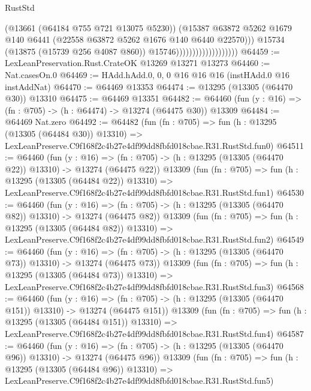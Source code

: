 \begin{lexlean}{RustStd}
\begin{coremodule}
                                            (@13661 (@64184 @755 @721 @13075 @5230))
                                            (@15387
                                              @63872
                                              @5262
                                              @1679
                                              @140
                                              @6441
                                              (@22558 @63872 @5262 @1676 @140 @6440 @22570)))
                                          @15734
                                          (@13875 (@15739 @256 @4087 @860))
                                          @15746)))))))))))))))))))
@64459 := LexLeanPreservation.Rust.CrateOK @13269 @13271 @13273
@64460 := Nat.casesOn.{0}
@64469 := HAdd.hAdd.{0, 0, 0} @16 @16 @16 (instHAdd.{0} @16 instAddNat)
@64470 := @64469 @13353
@64474 := @13295 (@13305 (@64470 @30)) @13310
@64475 := @64469 @13351
@64482 := @64460 (fun (y : @16) => (fn : @705) -> (h : @64474) -> @13274 (@64475 @30)) @13309
@64484 := @64469 Nat.zero
@64492 := @64482
    (fun (fn : @705) =>
    fun (h : @13295 (@13305 (@64484 @30)) @13310) =>
    LexLeanPreserve.C9f168f2c4b27e4df99dd8fbfd018cbae.R31.RustStd.fun0)
@64511 := @64460
    (fun (y : @16) =>
    (fn : @705) -> (h : @13295 (@13305 (@64470 @22)) @13310) -> @13274 (@64475 @22))
    @13309
    (fun (fn : @705) =>
    fun (h : @13295 (@13305 (@64484 @22)) @13310) =>
    LexLeanPreserve.C9f168f2c4b27e4df99dd8fbfd018cbae.R31.RustStd.fun1)
@64530 := @64460
    (fun (y : @16) =>
    (fn : @705) -> (h : @13295 (@13305 (@64470 @82)) @13310) -> @13274 (@64475 @82))
    @13309
    (fun (fn : @705) =>
    fun (h : @13295 (@13305 (@64484 @82)) @13310) =>
    LexLeanPreserve.C9f168f2c4b27e4df99dd8fbfd018cbae.R31.RustStd.fun2)
@64549 := @64460
    (fun (y : @16) =>
    (fn : @705) -> (h : @13295 (@13305 (@64470 @73)) @13310) -> @13274 (@64475 @73))
    @13309
    (fun (fn : @705) =>
    fun (h : @13295 (@13305 (@64484 @73)) @13310) =>
    LexLeanPreserve.C9f168f2c4b27e4df99dd8fbfd018cbae.R31.RustStd.fun3)
@64568 := @64460
    (fun (y : @16) =>
    (fn : @705) -> (h : @13295 (@13305 (@64470 @151)) @13310) -> @13274 (@64475 @151))
    @13309
    (fun (fn : @705) =>
    fun (h : @13295 (@13305 (@64484 @151)) @13310) =>
    LexLeanPreserve.C9f168f2c4b27e4df99dd8fbfd018cbae.R31.RustStd.fun4)
@64587 := @64460
    (fun (y : @16) =>
    (fn : @705) -> (h : @13295 (@13305 (@64470 @96)) @13310) -> @13274 (@64475 @96))
    @13309
    (fun (fn : @705) =>
    fun (h : @13295 (@13305 (@64484 @96)) @13310) =>
    LexLeanPreserve.C9f168f2c4b27e4df99dd8fbfd018cbae.R31.RustStd.fun5)

\end{coremodule}
\end{lexlean}

